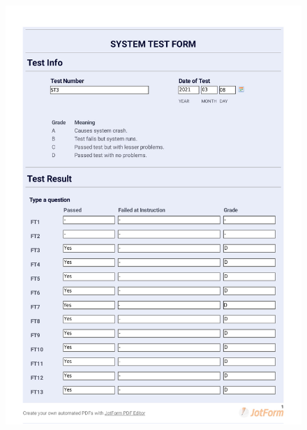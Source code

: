 \documentclass{article}
\begin{document}
 \begin{figure}
     \centering
    \includegraphics[trim={0cm 3.5cm 0cm 0cm}, clip,width=13cm]{images/2021-03-08_Anas_ST3-1}
     \renewcommand\figurename{Figure}
     \label{fig:my_label}
 \end{figure}
 
\end{document}
